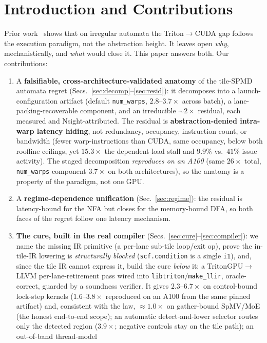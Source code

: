 \documentclass[sigplan,10pt]{acmart}
\begin{document}
\section{Introduction and Contributions}
Prior work~\cite{paper1} shows that on irregular automata the Triton$\rightarrow$CUDA gap
follows the execution paradigm, not the abstraction height. It leaves open \emph{why}, mechanistically,
and \emph{what} would close it. This paper answers both. Our contributions:
\begin{enumerate}
\item A \textbf{falsifiable, cross-architecture-validated anatomy} of the tile-SPMD automata regret
(Secs.~\ref{sec:decomp}--\ref{sec:resid}): it decomposes into a launch-configuration artifact
(default \texttt{num\_warps}, $2.8$--$3.7\times$ across batch), a lane-packing-recoverable component,
and an irreducible ${\sim}2\times$ residual, each measured and Nsight-attributed. The residual is
\textbf{abstraction-denied intra-warp latency hiding}, not redundancy, occupancy, instruction count,
or bandwidth (fewer warp-instructions than CUDA, same occupancy, below both roofline ceilings, yet
$15.3\times$ the dependent-load stall and $9.9\%$ vs.\ $41\%$ issue activity). The staged decomposition
\emph{reproduces on an A100} (same $26\times$ total, \texttt{num\_warps} component $3.7\times$ on both
architectures), so the anatomy is a property of the paradigm, not one GPU.
\item A \textbf{regime-dependence unification} (Sec.~\ref{sec:regime}): the residual is latency-bound
for the NFA but closes for the memory-bound DFA, so both faces of the regret follow one latency mechanism.
\item \textbf{The cure, built in the real compiler} (Secs.~\ref{sec:cure}--\ref{sec:compiler}): we name
the missing IR primitive (a per-lane sub-tile loop/exit op), prove the in-tile-IR lowering is
\emph{structurally blocked} (\texttt{scf.condition} is a single \texttt{i1}), and, since the tile IR
cannot express it, build the cure \emph{below} it: a \mbox{TritonGPU$\rightarrow$LLVM} per-lane-retirement
pass wired into \texttt{libtriton}/\texttt{make\_llir}, oracle-correct, guarded by a soundness verifier.
It gives $2.3$--$6.7\times$ on control-bound lock-step kernels ($1.6$--$3.8\times$ reproduced on an
A100 from the same pinned artifact) and, consistent with the law, ${\approx}1.0\times$ on gather-bound
SpMV/MoE (the honest end-to-end scope); an automatic detect-and-lower selector routes only
the detected region ($3.9\times$; negative controls stay on the tile path); an out-of-band thread-model

\end{enumerate}
\end{document}
